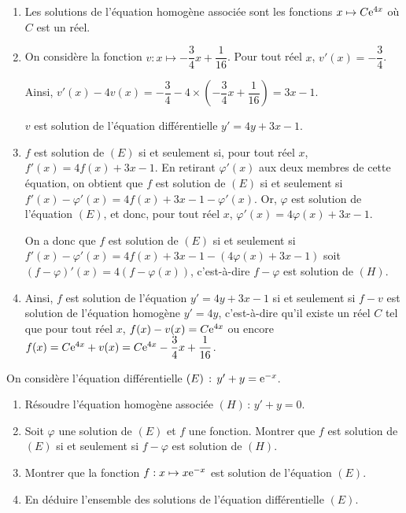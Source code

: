 \documentclass[11pt,fleqn, openany]{book} %
\begin{document}
\begin{solution}\hspace{0pt}

\begin{enumerate} 
\item Les solutions de l'équation homogène associée sont les fonctions \(x\mapsto C\mathrm{e}^{4x}\) où \(C\) est un réel.
\item On considère la fonction \(v:x\mapsto -\dfrac{3}{4}x+\dfrac{1}{16}\). Pour tout réel \(x\), \(v'(x)=-\dfrac{3}{4}\). 

Ainsi, $v'(x)-4v(x)=-\dfrac{3}{4}-4\times\left( -\dfrac{3}{4}x+\dfrac{1}{16}\right)=3x-1$.

\(v\) est solution de l'équation différentielle \(y'=4y+3x-1\).
\item \(f\) est solution de \((E)\) si et seulement si, pour tout réel \(x\), \(f'(x)=4f(x)+3x-1\). En retirant \(\varphi'(x)\) aux deux membres de cette équation, on obtient que \(f\) est solution de \((E)\) si et seulement si \(f'(x)-\varphi '(x)=4f(x)+3x-1-\varphi '(x)\). Or, \(\varphi\) est solution de l'équation \((E)\), et donc, pour tout réel \(x\), \(\varphi' (x) = 4\varphi (x)+3x-1\).

	On a donc que \(f\) est solution de \((E)\) si et seulement si \(f'(x)-\varphi '(x)=4f(x)+3x-1-(4\varphi (x)+3x-1)\) soit \((f-\varphi)'(x) = 4 (f-\varphi(x))\), c'est-à-dire \(f-\varphi\) est solution de \((H)\).
\item Ainsi, \(f\) est solution de l'équation \(y'=4y+3x-1\) si et seulement si \(f-v\) est solution de l'équation homogène \(y'=4y\), c'est-à-dire qu'il existe un réel \(C\) tel que pour tout réel \(x\), \(f(x)-v(x)=C\mathrm{e}^{4x}\) ou encore \(f(x)=C\mathrm{e}^{4x}+v(x)=C\mathrm{e}^{4x}-\dfrac{3}{4}x+\dfrac{1}{16}\).
\end{enumerate}
 \end{solution}



\begin{exercise}On considère l'équation différentielle $(E)\, :\, y'+y=\mathrm{e}^{-x }$.
\begin{enumerate}
\item Résoudre l'équation homogène associée $(H)\,:\, y'+y=0$.
\item Soit $\varphi$ une solution de $(E)$ et $f$ une fonction. Montrer que $f$ est solution de $(E)$ si et seulement si $f-\varphi$ est solution de $(H)$.
\item Montrer que la fonction $f:x\mapsto x\mathrm{e}^{-x}$ est solution de l'équation $(E)$.
\item En déduire l'ensemble des solutions de l'équation différentielle $(E)$.
\end{enumerate}\end{exercise}
\end{document}
